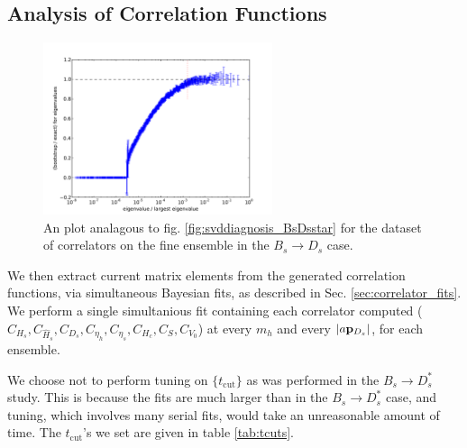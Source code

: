 \subsection{Analysis of Correlation Functions}

\begin{figure}[htb!]
  \begin{center}
    \hspace{-10pt}
    \includegraphics[width=0.60\textwidth]{images/BsDs/svddiagnosis_fine.pdf}
    \caption{An plot analagous to fig. \ref{fig:svddiagnosis_BsDsstar} for the dataset of correlators on the fine ensemble in the $B_s\to D_s$ case. \label{fig:svddiagnosis_BsDs}}
  \end{center}
\end{figure}

We then extract current matrix elements from the generated correlation functions, via simultaneous Bayesian fits, as described in Sec. \ref{sec:correlator_fits}. We perform a single simultanious fit containing each correlator computed ($C_{H_s},C_{\hat{H}_s},C_{D_s},C_{\eta_h},C_{\eta_s},C_{H_c},C_S,C_{V_0}$) at every $m_h$ and every $|a{\bf{p}}_{D_s}|$, for each ensemble.

We choose not to perform tuning on $\{t_{\text{cut}}\}$ as was performed in the $B_s\to D_s^*$ study. This is because the fits are much larger than in the $B_s\to D_s^*$ case, and tuning, which involves many serial fits, would take an unreasonable amount of time. The $t_{\text{cut}}$'s we set are given in table \ref{tab:tcuts}.


